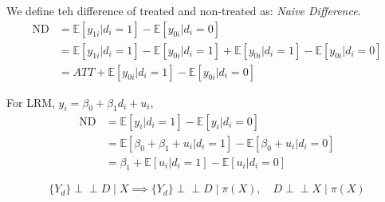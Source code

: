 We define teh difference of treated and non-treated as: \textit{Naive Difference}.
\begin{align*}
  \text{ND} &= \mathbb{E}[y_{1i} | d_i = 1] - \mathbb{E}[y_{0i} | d_i = 0]\\
  &= \mathbb{E}[y_{1i} | d_i = 1] - \mathbb{E}[y_{0i} | d_i = 1] + \mathbb{E}[y_{0i} | d_i =1] - \mathbb{E}[y_{0i} | d_i = 0] \\
  &= ATT + \mathbb{E}[y_{0i} | d_i = 1] - \mathbb{E}[y_{0i} | d_i = 0]
\end{align*}

For LRM, $y_i = \beta_0 + \beta_1 d_i + u_i$,
\begin{align*}
  \text{ND} &= \mathbb{E}[y_i | d_i = 1] - \mathbb{E}[y_i | d_i = 0]\\
  &= \mathbb{E}[\beta_0 + \beta_1 + u_i | d_i = 1] - \mathbb{E}[\beta_0 + u_i | d_i = 0]\\
  &= \beta_1 + \mathbb{E}[u_i | d_i = 1] - \mathbb{E}[u_i | d_i = 0]  
\end{align*}



\[
\{Y_d\} \perp\!\!\!\perp D \mid X \implies \{Y_d\} \perp\!\!\!\perp D \mid \pi(X), \quad D \perp\!\!\!\perp X \mid \pi(X)
\]